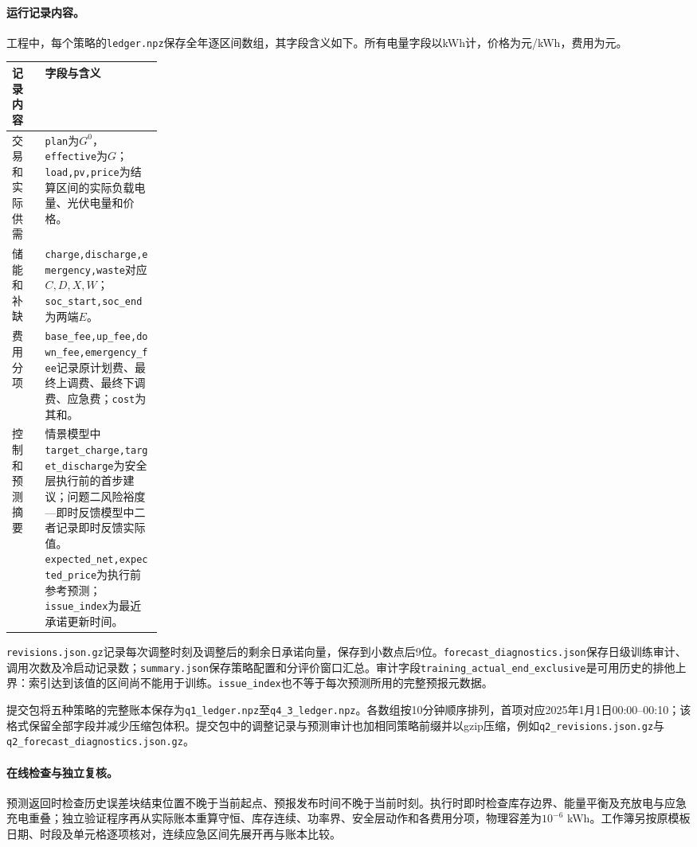 \paragraph{运行记录内容。}
工程中，每个策略的\texttt{ledger.npz}保存全年逐区间数组，其字段含义如下。所有电量字段以kWh计，价格为元/kWh，费用为元。
\begin{center}
\small
\begin{tabularx}{\linewidth}{p{0.22\linewidth}Y}
\toprule
记录内容 & 字段与含义\\
\midrule
交易和实际供需 & \texttt{plan}为$G^0$，\texttt{effective}为$G$；\texttt{load,pv,price}为结算区间的实际负载电量、光伏电量和价格。\\
储能和补缺 & \texttt{charge,discharge,emergency,waste}对应$C,D,X,W$；\texttt{soc\_start,soc\_end}为两端$E$。\\
费用分项 & \texttt{base\_fee,up\_fee,down\_fee,emergency\_fee}记录原计划费、最终上调费、最终下调费、应急费；\texttt{cost}为其和。\\
控制和预测摘要 & 情景模型中\texttt{target\_charge,target\_discharge}为安全层执行前的首步建议；问题二风险裕度—即时反馈模型中二者记录即时反馈实际值。\texttt{expected\_net,expected\_price}为执行前参考预测；\texttt{issue\_index}为最近承诺更新时间。\\
\bottomrule
\end{tabularx}
\end{center}
\texttt{revisions.json.gz}记录每次调整时刻及调整后的剩余日承诺向量，保存到小数点后9位。\texttt{forecast\_diagnostics.json}保存日级训练审计、调用次数及冷启动记录数；\texttt{summary.json}保存策略配置和分评价窗口汇总。审计字段\texttt{training\_\allowbreak actual\_\allowbreak end\_\allowbreak exclusive}是可用历史的排他上界：索引达到该值的区间尚不能用于训练。\texttt{issue\_index}也不等于每次预测所用的完整预报元数据。

提交包将五种策略的完整账本保存为\texttt{q1\_ledger.npz}至\texttt{q4\_3\_ledger.npz}。各数组按10分钟顺序排列，首项对应2025年1月1日00:00--00:10；该格式保留全部字段并减少压缩包体积。提交包中的调整记录与预测审计也加相同策略前缀并以gzip压缩，例如\texttt{q2\_revisions.json.gz}与\texttt{q2\_forecast\_diagnostics.json.gz}。

\paragraph{在线检查与独立复核。}
预测返回时检查历史误差块结束位置不晚于当前起点、预报发布时间不晚于当前时刻。执行时即时检查库存边界、能量平衡及充放电与应急充电重叠；独立验证程序再从实际账本重算守恒、库存连续、功率界、安全层动作和各费用分项，物理容差为$10^{-6}$ kWh。工作簿另按原模板日期、时段及单元格逐项核对，连续应急区间先展开再与账本比较。

